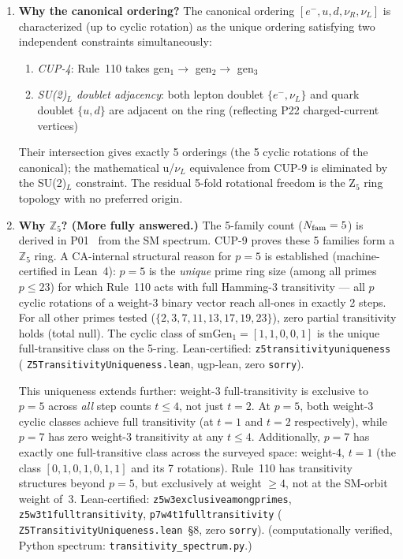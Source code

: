 \documentclass[11pt]{article}
\theoremstyle{remark}
\newcommand{\lean}[1]{%
  \penalty-100
  \begingroup\def\_{\textunderscore\allowbreak}\texttt{#1}\endgroup}
\begin{document}
\begin{enumerate}
\item \textbf{Why the canonical ordering?}
The canonical ordering $[e^-, u, d, \nu_R, \nu_L]$ is characterized (up to cyclic rotation)
as the unique ordering satisfying two independent constraints simultaneously:
\begin{enumerate}[label=(\roman*)]
\item \emph{CUP-4}: Rule~110 takes gen$_1 \to$ gen$_2 \to$ gen$_3$
\item \emph{SU(2)$_L$ doublet adjacency}: both lepton doublet $\{e^-, \nu_L\}$ and
  quark doublet $\{u, d\}$ are adjacent on the ring (reflecting P22 charged-current vertices)
\end{enumerate}
Their intersection gives exactly 5 orderings (the 5 cyclic rotations of the canonical);
the mathematical u/$\nu_L$ equivalence from CUP-9 is eliminated by the SU(2)$_L$ constraint.
The residual 5-fold rotational freedom is the Z$_5$ ring topology with no preferred origin.

\item \textbf{Why $\mathbb{Z}_5$? (More fully answered.)}
The 5-family count ($N_{\rm fam} = 5$) is derived in P01~\cite{Spivack2025_FirstPrinciplesSM} from the SM spectrum.
CUP-9 proves these 5 families form a $\mathbb{Z}_5$ ring. A CA-internal structural reason
for $p=5$ is established (machine-certified in Lean~4): $p=5$ is the \emph{unique} prime ring size
(among all primes $p \leq 23$) for which Rule~110 acts with full Hamming-3 transitivity ---
all $p$ cyclic rotations of a weight-3 binary vector reach all-ones in exactly 2 steps.
For all other primes tested ($\{2,3,7,11,13,17,19,23\}$), zero partial transitivity holds (total null).
The cyclic class of $\mathrm{smGen}_1 = [1,1,0,0,1]$ is the unique full-transitive class
on the 5-ring.
Lean-certified: \lean{z5\_transitivity\_uniqueness} (\lean{Z5Transitivity\-Uniqueness.lean},
ugp-lean, zero \texttt{sorry}).

This uniqueness extends further: weight-3 full-transitivity is exclusive to $p=5$
across \emph{all} step counts $t \leq 4$, not just $t=2$. At $p=5$, both weight-3 cyclic
classes achieve full transitivity (at $t=1$ and $t=2$ respectively), while $p=7$ has
zero weight-3 transitivity at any $t \leq 4$. Additionally, $p=7$ has exactly one
full-transitive class across the surveyed space: weight-4, $t=1$ (the class $[0,1,0,1,0,1,1]$
and its 7 rotations). Rule~110 has transitivity structures beyond $p=5$, but exclusively
at weight $\geq 4$, not at the SM-orbit weight of~3.
Lean-certified: \lean{z5\_w3\_exclusive\_\allowbreak among\_primes}, \lean{z5\_w3\_t1\_full\_transitivity},
\lean{p7\_w4\_t1\_full\_transitivity}
(\lean{Z5Transitivity\-Uniqueness.lean}~\S8, zero \texttt{sorry}).
(computationally verified, Python spectrum: \texttt{transitivity\_spectrum.py}.)


\end{enumerate}
\end{document}
